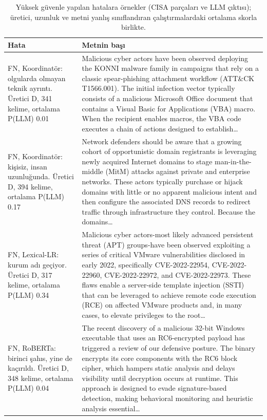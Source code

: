 \begin{table}[t]
\centering
\footnotesize
\caption{Yüksek güvenle yapılan hatalara örnekler (CISA parçaları ve LLM çıktısı); üretici, uzunluk ve metni yanlış sınıflandıran çalıştırmalardaki ortalama skorla birlikte.}
\label{tab:examples}
\begin{tabular}{p{4.2cm}p{12.8cm}}
\toprule
Hata & Metnin başı \\
\midrule
FN, Koordinatör: olgularda olmayan teknik ayrıntı. Üretici D, 341 kelime, ortalama P(LLM) 0.01 & Malicious cyber actors have been observed deploying the KONNI malware family in campaigns that rely on a classic spear-phishing attachment workflow (ATT\&CK T1566.001). The initial infection vector typically consists of a malicious Microsoft Office document that contains a Visual Basic for Applications (VBA) macro. When the recipient enables macros, the VBA code executes a chain of actions designed to establish\ldots \\
FN, Koordinatör: kişisiz, insan uzunluğunda. Üretici D, 394 kelime, ortalama P(LLM) 0.17 & Network defenders should be aware that a growing cohort of opportunistic domain registrants is leveraging newly acquired Internet domains to stage man-in-the-middle (MitM) attacks against private and enterprise networks. These actors typically purchase or hijack domains with little or no apparent malicious intent and then configure the associated DNS records to redirect traffic through infrastructure they control. Because the domains\ldots \\
FN, Lexical-LR: kurum adı geçiyor. Üretici D, 317 kelime, ortalama P(LLM) 0.34 & Malicious cyber actors-most likely advanced persistent threat (APT) groups-have been observed exploiting a series of critical VMware vulnerabilities disclosed in early 2022, specifically CVE-2022-22954, CVE-2022-22960, CVE-2022-22972, and CVE-2022-22973. These flaws enable a server-side template injection (SSTI) that can be leveraged to achieve remote code execution (RCE) on affected VMware products and, in many cases, to elevate privileges to the root\ldots \\
FN, RoBERTa: birinci şahıs, yine de kaçırıldı. Üretici D, 348 kelime, ortalama P(LLM) 0.04 & The recent discovery of a malicious 32-bit Windows executable that uses an RC6-encrypted payload has triggered a review of our defensive posture. The binary encrypts its core components with the RC6 block cipher, which hampers static analysis and delays visibility until decryption occurs at runtime. This approach is designed to evade signature-based detection, making behavioral monitoring and heuristic analysis essential\ldots \\

\end{tabular}
\end{table}
